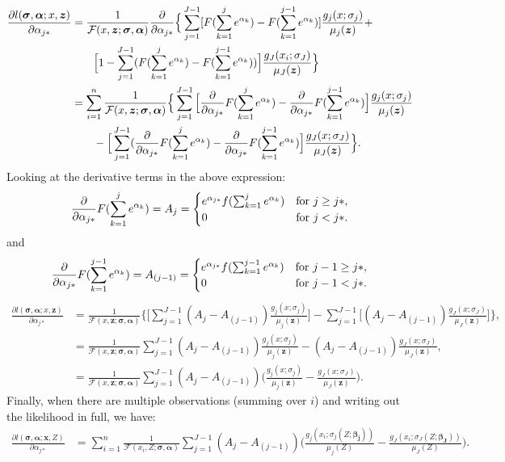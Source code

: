 \begin{align*}
\frac{\partial l(\bm{\sigma},\bm{\alpha};x,\bm{z})}{\partial \alpha_{j*}} &= \frac{1}{\mathcal{F}(x, \bm{z};\bm{\sigma},\bm{\alpha})} \frac{\partial}{\partial \alpha_{j*}} \Big\{ \sum_{j=1}^{J-1} [F(\sum_{k=1}^j e^{\alpha_k}) - F(\sum_{k=1}^{j-1} e^{\alpha_k})] \frac{g_j(x;\sigma_j)}{\mu_j(\bm{z})} +\\
& \qquad \Big[1-\sum_{j=1}^{J-1}(F(\sum_{k=1}^j e^{\alpha_k}) - F(\sum_{k=1}^{j-1} e^{\alpha_k})) \Big] \frac{g_J(x_i;\sigma_J)}{\mu_J(\bm{z})}\Big\}\\
&= \sum_{i=1}^n \frac{1}{\mathcal{F}(x, \bm{z};\bm{\sigma},\bm{\alpha})} \Big\{ \sum_{j=1}^{J-1} \Big[\frac{\partial}{\partial \alpha_{j*}} F(\sum_{k=1}^j e^{\alpha_k}) - \frac{\partial}{\partial \alpha_{j*}} F(\sum_{k=1}^{j-1} e^{\alpha_k})\Big] \frac{g_j(x;\sigma_j)}{\mu_j(\bm{z})} \\
&\qquad -\Big[\sum_{j=1}^{J-1} (\frac{\partial}{\partial \alpha_{j*}} F(\sum_{k=1}^j e^{\alpha_k}) - \frac{\partial}{\partial \alpha_{j*}} F(\sum_{k=1}^{j-1} e^{\alpha_k})\Big] \frac{g_J(x;\sigma_J)}{\mu_J(\bm{z})}\Big\}.
\end{align*}
Looking at the derivative terms in the above expression:
\begin{equation*}
\frac{\partial}{\partial \alpha_{j*}} F(\sum_{k=1}^j e^{\alpha_k})=A_{j}=\begin{cases}
e^{\alpha_{j*}}f(\sum_{k=1}^j e^{\alpha_k})& \text{for $j\geq j*$},\\
0 & \text{for $j<j*$}.
\end{cases}
\end{equation*}
and
\begin{equation*}
\frac{\partial}{\partial \alpha_{j*}} F(\sum_{k=1}^{j-1} e^{\alpha_k})=A_{(j-1)}=\begin{cases}
e^{\alpha_{j*}}f(\sum_{k=1}^{j-1} e^{\alpha_k})& \text{for $j-1\geq j*$},\\
0 & \text{for $j-1<j*$}.
\end{cases}
\end{equation*}
\begin{align*}
\frac{\partial l(\bm{\sigma},\bm{\alpha}; x,\bm{z})}{\partial \alpha_{j*}} &= \frac{1}{\mathcal{F}(x, \bm{z};\bm{\sigma},\bm{\alpha})} \Big\{ \Big[\sum_{j=1}^{J-1} (A_{j}-A_{(j-1)}) \frac{g_j(x;\sigma_j)}{\mu_j(\bm{z})}\Big] - \sum_{j=1}^{J-1}\Big[ (A_{j}-A_{(j-1)})\frac{g_J(x;\sigma_J)}{\mu_J(\bm{z})} \Big]\Big\},\\%
&= \frac{1}{\mathcal{F}(x, \bm{z};\bm{\sigma},\bm{\alpha})} \sum_{j=1}^{J-1} (A_{j}-A_{(j-1)}) \frac{g_j(x;\sigma_j)}{\mu_j(\bm{z})}-(A_{j}-A_{(j-1)})\frac{g_J(x;\sigma_J)}{\mu_J(\bm{z})},\\
&= \frac{1}{\mathcal{F}(x, \bm{z};\bm{\sigma},\bm{\alpha})} \sum_{j=1}^{J-1} (A_{j}-A_{(j-1)}) \Big(\frac{g_j(x;\sigma_j)}{\mu_j(\bm{z})}-\frac{g_J(x;\sigma_J)}{\mu_J(\bm{z})} \Big).
\end{align*}
Finally, when there are multiple observations (summing over $i$) and writing out the likelihood in full, we have:
\begin{align*}
\frac{\partial l(\bm{\sigma},\bm{\alpha}; \bm{x},Z)}{\partial \alpha_{j*}} &= \sum_{i=1}^n \frac{1}{\mathcal{F}(x_i, Z;\bm{\sigma},\bm{\alpha})} \sum_{j=1}^{J-1} (A_{j}-A_{(j-1)}) \Big( \frac{g_j(x_i;\sigma_j(Z;\bm{\beta_j}))}{\mu_j(Z)} - \frac{g_J(x_i;\sigma_J(Z;\bm{\beta_J}))}{\mu_J(Z)} \Big).
\end{align*}

